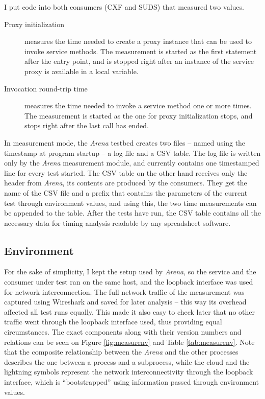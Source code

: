 \noindent
I put code into both consumers (CXF and SUDS) that measured two values.
\begin{description}
 \item[Proxy initialization] measures the time needed to create a proxy instance that can be used to invoke service methods. The measurement is started as the first statement after the entry point, and is stopped right after an instance of the service proxy is available in a local variable.
 \item[Invocation round-trip time] measures the time needed to invoke a service method one or more times. The measurement is started as the one for proxy initialization stops, and stops right after the last call has ended.
\end{description}

\noindent
In measurement mode, the \emph{Arena} testbed creates two files -- named using the timestamp at program startup -- a log file and a CSV table. The log file is written only by the \emph{Arena} measurement module, and currently contains one timestamped line for every test started. The CSV table on the other hand receives only the header from \emph{Arena}, its contents are produced by the consumers. They get the name of the CSV file and a prefix that contains the parameters of the current test through environment values, and using this, the two time measurements can be appended to the table. After the tests have run, the CSV table contains all the necessary data for timing analysis readable by any spreadsheet software.

\subsection{Environment}

For the sake of simplicity, I kept the setup used by \emph{Arena}, so the service and the consumer under test ran on the same host, and the loopback interface was used for network interconnection. The full network traffic of the measurement was captured using Wireshark and saved for later analysis -- this way its overhead affected all test runs equally. This made it also easy to check later that no other traffic went through the loopback interface used, thus providing equal circumstances. The exact components along with their version numbers and relations can be seen on Figure \ref{fig:measurenv} and Table \ref{tab:measurenv}. Note that the composite relationship between the \emph{Arena} and the other processes describes the one between a process and a subprocess, while the cloud and the lightning symbols represent the network interconnectivity through the loopback interface, which is ``bootstrapped'' using information passed through environment values.

